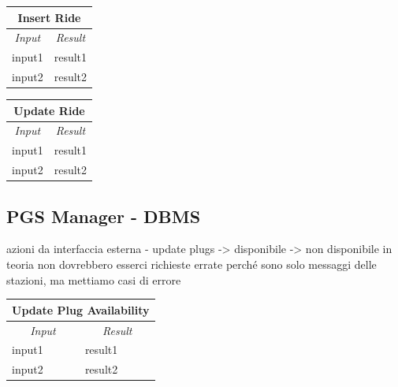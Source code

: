\documentclass[english]{article}
\begin{document}
\begin{center}

	\begin{tabular}{ | p{6cm} | p{6cm} | }
		\hline 


		\hline

		\multicolumn{2}{|c|}{\textbf{Insert Ride}} \\
		\hline
		\multicolumn{1}{|c|}{\textit{Input}} & \multicolumn{1}{c|}{\textit{Result}} \\
		\hline
		input1 & result1 \\
		\hline
		input2 & result2 \\
		\hline
	\end{tabular}
\end{center}


\begin{center}

	\begin{tabular}{ | p{6cm} | p{6cm} | }
		\hline 


		\hline

		\multicolumn{2}{|c|}{\textbf{Update Ride}} \\
		\hline
		\multicolumn{1}{|c|}{\textit{Input}} & \multicolumn{1}{c|}{\textit{Result}} \\
		\hline
		input1 & result1 \\
		\hline
		input2 & result2 \\
		\hline
	\end{tabular}
\end{center}

\subsection{PGS Manager - DBMS}
azioni da interfaccia esterna
- update plugs
	-> disponibile
	-> non disponibile
in teoria non dovrebbero esserci richieste errate perché sono solo messaggi delle stazioni, ma mettiamo casi di errore

\begin{center}

	\begin{tabular}{ | p{6cm} | p{6cm} | }
		\hline 


		\hline

		\multicolumn{2}{|c|}{\textbf{Update Plug Availability}} \\
		\hline
		\multicolumn{1}{|c|}{\textit{Input}} & \multicolumn{1}{c|}{\textit{Result}} \\
		\hline
		input1 & result1 \\
		\hline
		input2 & result2 \\
		\hline
	\end{tabular}
\end{center}
\end{document}
